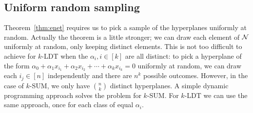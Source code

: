 \subsection{Uniform random sampling}
\label{app:sampling}

Theorem~\ref{thm:enet} requires us to pick a sample of the hyperplanes
uniformly at random. Actually the theorem is a little stronger; we can draw
each element of $\mathcal{N}$ uniformly at random, only keeping distinct elements.
This is not too difficult to achieve for $k$-LDT when the $\alpha_i,i\in[k]$
are all distinct: to pick a hyperplane of the form $\alpha_0 + \alpha_1 x_{i_1}
+ \alpha_2 x_{i_2} + \cdots + \alpha_k x_{i_k} = 0$ uniformly at random, we can
draw each $i_j\in[n]$ independently and there are $n^k$ possible outcomes.
However, in the case of $k$-SUM, we only have $\binom{n}{k}$ distinct
hyperplanes. A simple dynamic programming approach solves the problem for
\(k\)-SUM. For \(k\)-LDT we can use the same approach, once for each class of equal
$\alpha_i$.

